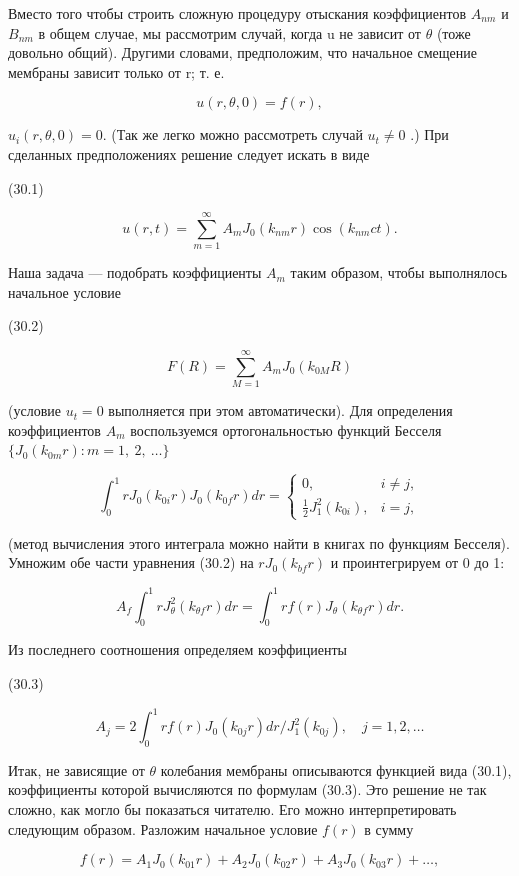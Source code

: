 \documentclass[
  ukrainian,
]{article}
\begin{document}
Вместо того чтобы строить сложную процедуру отыскания коэффициентов
\(A_{nm}\) и \(B_{nm}\) в общем случае, мы рассмотрим случай, когда u не
зависит от \(\theta\) (тоже довольно общий). Другими словами,
предположим, что начальное смещение мембраны зависит только от r; т. е.

\[
u(r, \theta, 0) = f(r),
\]

\(u_i(r, \theta, 0) = 0.\) (Так же легко можно рассмотреть случай
\(u_t \neq 0\) .) При сделанных предположениях решение следует искать в
виде

(30.1)

\[
u(r, t) = \sum_{m=1}^{\infty} A_m J_0(k_{nm}r) \cos(k_{nm}ct).
\]

Наша задача --- подобрать коэффициенты \(A_m\) таким образом, чтобы
выполнялось начальное условие

(30.2)

\[
F(R) = \sum_{M=1}^{\infty} A_m J_0(k_{0M}R)
\]

(условие \(u_t=0\) выполняется при этом автоматически). Для определения
коэффициентов \(A_m\) воспользуемся ортогональностью функций Бесселя
\(\{J_0(k_{0m}r)\colon m=1,\ 2,\ \dots\}\)

\[
\int_{0}^{1} r J_{0}(k_{0i}r) J_{0}(k_{0f}r) dr = \begin{cases} 0, & i \neq j, \\ \frac{1}{2} J_{1}^{2}(k_{0i}), & i = j, \end{cases}
\]

(метод вычисления этого интеграла можно найти в книгах по функциям
Бесселя). Умножим обе части уравнения (30.2) на
\(rJ_0\left(k_{bf}r\right)\) и проинтегрируем от 0 до 1:

\[
A_{f}\int_{0}^{1}rJ_{\theta}^{2}(k_{\theta f}r)dr=\int_{0}^{1}rf(r)J_{\theta}(k_{\theta f}r)dr.
\]

Из последнего соотношения определяем коэффициенты

(30.3)

\[
A_{j} = 2 \int_{0}^{1} r f(r) J_{0}(k_{0j}r) dr / J_{1}^{2}(k_{0j}), \quad j = 1, 2, \dots
\]

Итак, не зависящие от \(\theta\) колебания мембраны описываются функцией
вида (30.1), коэффициенты которой вычисляются по формулам (30.3). Это
решение не так сложно, как могло бы показаться читателю. Его можно
интерпретировать следующим образом. Разложим начальное условие \(f(r)\)
в сумму

\[
f(r) = A_1 J_0(k_{01}r) + A_2 J_0(k_{02}r) + A_3 J_0(k_{03}r) + \dots,
\]
\end{document}
